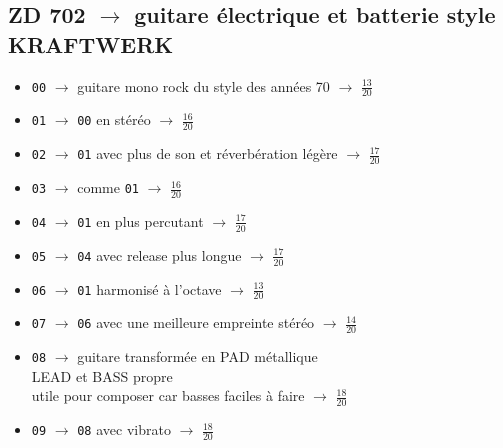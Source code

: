 \documentclass[a4paper, 13pt]{article}
\begin{document}
\subsection*{ZD 702 $\rightarrow$ guitare électrique et batterie style KRAFTWERK} 
\begin{itemize}
    \item \texttt{00} $\rightarrow$ guitare mono rock du style des années 70 $\rightarrow$ \Large{$\frac{13}{20}$} \normalsize \vspace{0.2cm}
    \item \texttt{01} $\rightarrow$ \texttt{00} en stéréo $\rightarrow$ \Large{$\frac{16}{20}$} \normalsize \vspace{0.2cm}
    \item \texttt{02} $\rightarrow$ \texttt{01} avec plus de son et réverbération légère $\rightarrow$ \Large{$\frac{17}{20}$} \normalsize \vspace{0.2cm}
    \item \texttt{03} $\rightarrow$ comme \texttt{01} $\rightarrow$ \Large{$\frac{16}{20}$} \normalsize \vspace{0.2cm}
    \item \texttt{04} $\rightarrow$ \texttt{01} en plus percutant $\rightarrow$ \Large{$\frac{17}{20}$} \normalsize \vspace{0.2cm}
    \item \texttt{05} $\rightarrow$ \texttt{04} avec release plus longue $\rightarrow$ \Large{$\frac{17}{20}$} \normalsize \vspace{0.2cm}
    \item \texttt{06} $\rightarrow$ \texttt{01} harmonisé à l'octave $\rightarrow$ \Large{$\frac{13}{20}$} \normalsize \vspace{0.2cm}
    \item \texttt{07} $\rightarrow$ \texttt{06} avec une meilleure empreinte stéréo $\rightarrow$ \Large{$\frac{14}{20}$} \normalsize \vspace{0.2cm}
    \item \texttt{08} $\rightarrow$ guitare transformée en PAD métallique \\LEAD et BASS propre \\utile pour composer car basses faciles à faire $\rightarrow$ \Large{$\frac{18}{20}$} \normalsize \vspace{0.2cm}
    \item \texttt{09} $\rightarrow$ \texttt{08} avec vibrato $\rightarrow$ \Large{$\frac{18}{20}$} \normalsize \vspace{0.2cm}

\end{itemize}
\end{document}
